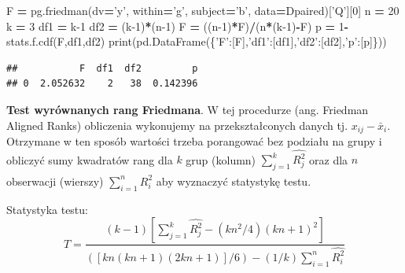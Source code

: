 \documentclass[polish,]{book}
\newenvironment{Shaded}{\begin{snugshade}}{\end{snugshade}}
\newcommand{\BuiltInTok}[1]{#1}
\newcommand{\DecValTok}[1]{\textcolor[rgb]{0.00,0.00,0.81}{#1}}
\newcommand{\NormalTok}[1]{#1}
\newcommand{\OperatorTok}[1]{\textcolor[rgb]{0.81,0.36,0.00}{\textbf{#1}}}
\newcommand{\StringTok}[1]{\textcolor[rgb]{0.31,0.60,0.02}{#1}}
\begin{document}
\begin{Shaded}
\begin{Highlighting}[]
\NormalTok{F }\OperatorTok{=}\NormalTok{ pg.friedman(dv}\OperatorTok{=}\StringTok{'y'}\NormalTok{, within}\OperatorTok{=}\StringTok{'g'}\NormalTok{, subject}\OperatorTok{=}\StringTok{'b'}\NormalTok{, data}\OperatorTok{=}\NormalTok{Dpaired)[}\StringTok{'Q'}\NormalTok{][}\DecValTok{0}\NormalTok{]}
\NormalTok{n }\OperatorTok{=} \DecValTok{20}
\NormalTok{k }\OperatorTok{=} \DecValTok{3}
\NormalTok{df1 }\OperatorTok{=}\NormalTok{ k}\DecValTok{-1}
\NormalTok{df2 }\OperatorTok{=}\NormalTok{ (k}\DecValTok{-1}\NormalTok{)}\OperatorTok{*}\NormalTok{(n}\DecValTok{-1}\NormalTok{)}
\NormalTok{F }\OperatorTok{=}\NormalTok{ ((n}\DecValTok{-1}\NormalTok{)}\OperatorTok{*}\NormalTok{F)}\OperatorTok{/}\NormalTok{(n}\OperatorTok{*}\NormalTok{(k}\DecValTok{-1}\NormalTok{)}\OperatorTok{-}\NormalTok{F)}
\NormalTok{p }\OperatorTok{=} \DecValTok{1}\OperatorTok{-}\NormalTok{stats.f.cdf(F,df1,df2)}
\BuiltInTok{print}\NormalTok{(pd.DataFrame(\{}\StringTok{'F'}\NormalTok{:[F],}\StringTok{'df1'}\NormalTok{:[df1],}\StringTok{'df2'}\NormalTok{:[df2],}\StringTok{'p'}\NormalTok{:[p]\}))}
\end{Highlighting}
\end{Shaded}

\begin{verbatim}
##           F  df1  df2         p
## 0  2.052632    2   38  0.142396
\end{verbatim}

\textbf{Test wyrównanych rang Friedmana}. W tej procedurze (ang. Friedman Aligned Ranks) obliczenia wykonujemy na przekształconych danych tj. \(x_{ij}-\bar{x}_i\). Otrzymane w ten sposób wartości trzeba porangować bez podziału na grupy i obliczyć sumy kwadratów rang dla \(k\) grup (kolumn) \(\sum_{j=1}^{k}\hat{R^2_j}\) oraz dla \(n\) obserwacji (wierszy) \(\sum_{i=1}^{n}\hat{R^2_i}\) aby wyznaczyć statystykę testu.

Statystyka testu:
\begin{equation}
T=\frac{(k-1)[\sum_{j=1}^{k}\hat{R^2_j}-(kn^2/4)(kn+1)^2]}{\left([kn(kn+1)(2kn+1)]/6\right)-(1/k)\sum_{i=1}^{n}\hat{R^2_i}}
\label{eq:FAR01}
\end{equation}
\end{document}
